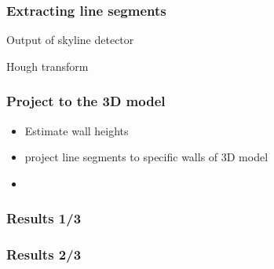 \documentclass{beamer}
\begin{document}
\frame
{
	\frametitle{Extracting line segments}
	\item  <+-| alert@+> Output of skyline detector
	\item  <+-| alert@+> Hough transform


}


\frame
{
	\frametitle{Project to the 3D model}
	\begin{itemize}
	\item  <+-| alert@+> Estimate wall heights 
	\item  <+-| alert@+> project line segments to specific walls of 3D model
	\item  <+-| alert@+>
	\end{itemize}
}


\frame
{
	\frametitle{Results 1/3}
}


\frame
{
	\frametitle{Results 2/3}
}
\end{document}
